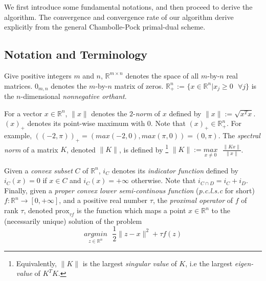 \documentclass[a4paper,9pt,journal]{IEEEtran}
\begin{document}
We first introduce some fundamental notations, and then proceed to derive the algorithm. The convergence and convergence rate
of our algorithm derive explicitly from the general Chambolle-Pock primal-dual scheme.

\subsection{Notation and Terminology}
Give positive integers $m$ and $n$, $\mathbb{R}^{m \times n}$ denotes
the space of all $m$-by-$n$ real matrices. $0_{m,n}$ denotes the $m$-by-$n$ matrix of zeros.
$\mathbb{R}^n_+$ := $\{x \in \mathbb{R}^n|x_j \ge 0 \text{ }  \forall j\}$ is the $n$-dimensional \textit{nonnegative orthant}.

For a vector $x \in \mathbb{R}^n$, $\|x\|$ denotes the $2$-\textit{norm} of $x$ defined by $\|x\| := \sqrt{x^Tx}$.
$(x)_+$ denotes its point-wise maximum with 0. Note that $(x)_+ \in \mathbb{R}^n_+$.
For example, $((-2, \pi))_+ = (max(-2, 0), max(\pi, 0)) = (0, \pi)$. The \textit{spectral norm} of a matrix $K$, denoted $\|K\|$, is defined by
\footnote{Equivalently, $\|K\|$ is the largest \textit{singular value} of $K$, i.e the largest \textit{eigen-value} of $K^TK$.}
$\|K\| := \underset{x \ne 0}{max}\text{ }\frac{\|Kx\|}{\|x\|}$.

Given a \textit{convex subset} $C$ of $\mathbb{R}^n$, $i_C$ denotes its \textit{indicator function} defined by
$i_C(x) = 0$ if $x \in C$ and $i_C(x) = +\infty$ otherwise. Note that $i_{C \cap D} = i_C + i_D$. Finally, given a \textit{proper convex lower semi-continous
function} (\textit{p.c.l.s.c} for short) $f : \mathbb{R}^n \rightarrow [0, +\infty]$, and a positive real number $\tau$, the \textit{proximal operator} of $f$ of rank $\tau$,
denoted $\text{prox}_{\tau f}$ is the function which maps a point $x \in \mathbb{R}^n$ to the (necessarily unique) solution of the problem
\begin{equation}
  \underset{z \in \mathbb{R}^n}{argmin}\text{ }\frac{1}{2}\|z - x\|^2 + \tau f(z)
\end{equation}

\end{document}
